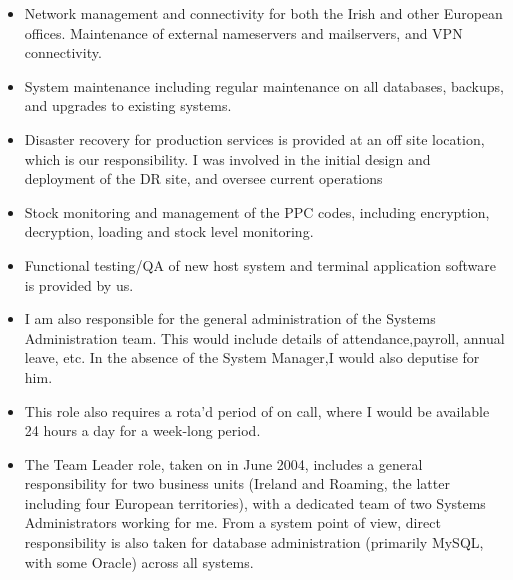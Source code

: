 \documentclass[letterpaper]{tenseconds} %
\begin{document}
\begin{twenty}
{\begin{itemize}
		\item Network management and connectivity for both the Irish and other European offices. Maintenance of external nameservers and mailservers, and VPN connectivity.
		\item System maintenance including regular maintenance on all databases, backups, and upgrades to existing systems.
		\item Disaster recovery for production services is provided at an off site location, which is our responsibility. I was involved in the initial design and deployment of the DR site, and oversee current operations
		\item Stock monitoring and management of the PPC codes, including encryption, decryption, loading and stock level monitoring.
		\item Functional testing/QA of new host system and terminal application software is provided by us.
		\item I am also responsible for the general administration of the Systems Administration team. This would include details of attendance,payroll, annual leave, etc. In the absence of the System Manager,I would also deputise for him.
		\item This role also requires a rota'd period of on call, where I would be available 24 hours a day for a week-long period.
		\item The Team Leader role, taken on in June 2004, includes a general responsibility for two business units (Ireland and Roaming, the latter including four European territories), with a dedicated team of two Systems Administrators working for me. From a system point of view, direct responsibility is also taken for database administration (primarily MySQL, with some Oracle) across all systems.
		\end{itemize}}
	\\

	        
\end{twenty}
\end{document}
